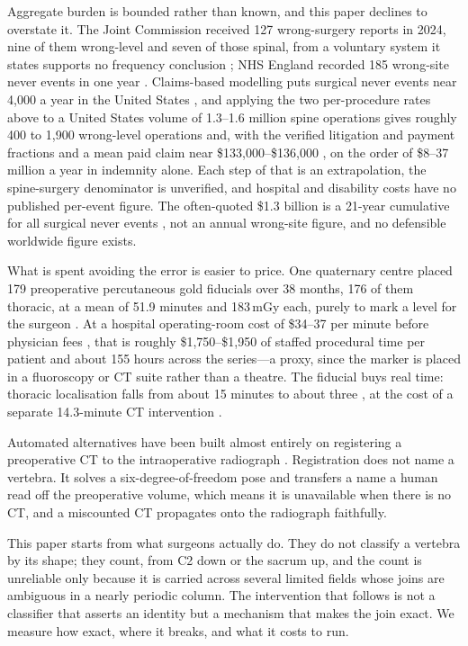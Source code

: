 \documentclass[11pt,letterpaper]{article}
\begin{document}
Aggregate burden is bounded rather than known, and this paper declines to overstate it. The Joint
Commission received 127 wrong-surgery reports in 2024, nine of them wrong-level and seven of those spinal,
from a voluntary system it states supports no frequency conclusion \citep{jc2024}; NHS England recorded 185
wrong-site never events in one year \citep{nhse2025}. Claims-based modelling puts surgical never events near
4,000 a year in the United States \citep{mehtsun2013}, and applying the two per-procedure rates above to a
United States volume of 1.3--1.6 million spine operations gives roughly 400 to 1,900 wrong-level operations
and, with the verified litigation and payment fractions and a mean paid claim near \$133,000--\$136,000
\citep{mehtsun2013,tan2023}, on the order of \$8--37 million a year in indemnity alone. Each step of that is
an extrapolation, the spine-surgery denominator is unverified, and hospital and disability costs have no
published per-event figure. The often-quoted \$1.3 billion is a 21-year cumulative for all surgical never
events \citep{mehtsun2013}, not an annual wrong-site figure, and no defensible worldwide figure exists.

What is spent avoiding the error is easier to price. One quaternary centre placed 179 preoperative
percutaneous gold fiducials over 38 months, 176 of them thoracic, at a mean of 51.9 minutes and 183\,mGy
each, purely to mark a level for the surgeon \citep{siminski2023}. At a hospital operating-room cost of
\$34--37 per minute before physician fees \citep{childers2018}, that is roughly \$1,750--\$1,950 of staffed
procedural time per patient and about 155 hours across the series---a proxy, since the marker is placed in a
fluoroscopy or CT suite rather than a theatre. The fiducial buys real time: thoracic localisation falls from
about 15 minutes to about three \citep{mongardi2021,upadhyaya2012}, at the cost of a separate 14.3-minute
CT intervention \citep{keil2024}.

Automated alternatives have been built almost entirely on registering a preoperative CT to the intraoperative
radiograph \citep{levelcheck2012,otake2015}. Registration does not name a vertebra. It solves a
six-degree-of-freedom pose and transfers a name a human read off the preoperative volume, which means it is
unavailable when there is no CT, and a miscounted CT propagates onto the radiograph faithfully.

This paper starts from what surgeons actually do. They do not classify a vertebra by its shape; they count,
from C2 down or the sacrum up, and the count is unreliable only because it is carried across several
limited fields whose joins are ambiguous in a nearly periodic column. The intervention that follows is not
a classifier that asserts an identity but a mechanism that makes the join exact. We measure how exact,
where it breaks, and what it costs to run.
\end{document}
